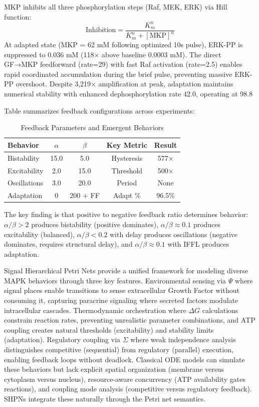 \documentclass[twocolumn,11pt]{article}
\begin{document}
MKP inhibits all three phosphorylation steps (Raf, MEK, ERK) via Hill function:
\begin{equation}
\text{Inhibition} = \frac{K_m^n}{K_m^n + [\text{MKP}]^n}
\end{equation}
At adapted state (MKP = 62 mM following optimized 10s pulse), ERK-PP is suppressed to 0.036 mM (118× above baseline 0.0003 mM). The direct GF→MKP feedforward (rate=29) with fast Raf activation (rate=2.5) enables rapid coordinated accumulation during the brief pulse, preventing massive ERK-PP overshoot. Despite 3,219× amplification at peak, adaptation maintains numerical stability with enhanced dephosphorylation rate 42.0, operating at 98.8%

Table summarizes feedback configurations across experiments:

\begin{table}[h]
\centering
\scriptsize
\caption{Feedback Parameters and Emergent Behaviors}
\label{tab:feedback_summary}
\begin{tabular}{@{}lcccc@{}}
\toprule
\textbf{Behavior} & $\alpha$ & $\beta$ & \textbf{Key Metric} & \textbf{Result} \\
\midrule
Bistability & 15.0 & 5.0 & Hysteresis & 577× \\
Excitability & 2.0 & 15.0 & Threshold & 500× \\
Oscillations & 3.0 & 20.0 & Period & None \\
Adaptation & 0 & 200 + FF & Adapt \% & 96.5\% \\
\bottomrule
\end{tabular}
\end{table}

The key finding is that positive to negative feedback ratio determines behavior: $\alpha/\beta > 2$ produces bistability (positive dominates), $\alpha/\beta \approx 0.1$ produces excitability (balanced), $\alpha/\beta < 0.2$ with delay produces oscillations (negative dominates, requires structural delay), and $\alpha/\beta \approx 0.1$ with IFFL produces adaptation.

Signal Hierarchical Petri Nets provide a unified framework for modeling diverse MAPK behaviors through three key features. Environmental sensing via $\Psi$ where signal places enable transitions to sense extracellular Growth Factor without consuming it, capturing paracrine signaling where secreted factors modulate intracellular cascades. Thermodynamic orchestration where $\Delta G$ calculations constrain reaction rates, preventing unrealistic parameter combinations, and ATP coupling creates natural thresholds (excitability) and stability limits (adaptation). Regulatory coupling via $\Sigma$ where weak independence analysis distinguishes competitive (sequential) from regulatory (parallel) execution, enabling feedback loops without deadlock. Classical ODE models can simulate these behaviors but lack explicit spatial organization (membrane versus cytoplasm versus nucleus), resource-aware concurrency (ATP availability gates reactions), and coupling mode analysis (competitive versus regulatory feedback). SHPNs integrate these naturally through the Petri net semantics.
\end{document}
